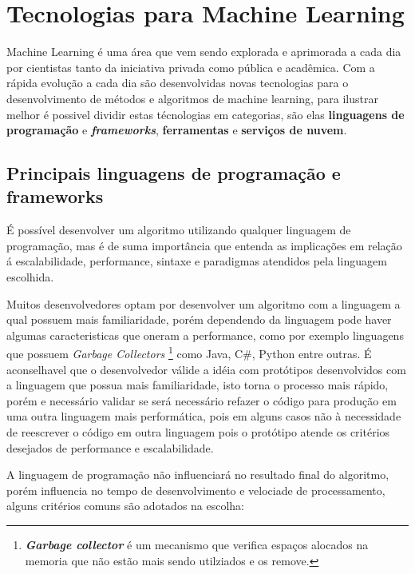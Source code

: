 \section{Tecnologias para Machine Learning}
\label{sec:tech-ml}

Machine Learning é uma área que vem sendo explorada e aprimorada a cada dia por cientistas tanto da iniciativa privada 
como pública e acadêmica. Com a rápida evolução a cada dia são desenvolvidas novas tecnologias para o desenvolvimento
de métodos e algoritmos de machine learning, para ilustrar melhor é possivel  dividir estas técnologias em categorias, são elas
\textbf{linguagens de programação} e \textbf{\textit{frameworks}}, \textbf{ferramentas} e \textbf{serviços de nuvem}. 

\subsection{Principais linguagens de programação e frameworks}
\label{subsec:ling-prog}

É possível desenvolver um algoritmo utilizando qualquer linguagem de programação, mas é de suma importância que entenda as implicações
em relação á escalabilidade, performance, sintaxe e paradigmas atendidos pela linguagem escolhida. 

Muitos desenvolvedores optam por desenvolver um algoritmo com a linguagem a qual possuem mais familiaridade, 
porém dependendo da linguagem pode haver algumas caracteristicas que  oneram a performance, como por exemplo linguagens que possuem 
\textit{Garbage Collectors} \footnote{\textbf{\textit{Garbage collector}} é um mecanismo que verifica espaços alocados na memoria que não estão mais sendo utilziados e os remove.} como Java, C\#, Python entre outras. É aconselhavel que o desenvolvedor válide a 
idéia com protótipos desenvolvidos com a linguagem que possua mais familiaridade, isto torna o processo mais rápido, porém e necessário
validar se será necessário refazer o código para produção em uma outra linguagem mais performática, pois em alguns casos não à necessidade
de reescrever o código em outra linguagem pois o protótipo atende os critérios desejados de performance e escalabilidade. 

A linguagem de programação não influenciará no resultado final do algoritmo, porém influencia no tempo de desenvolvimento e 
velociade de processamento, alguns critérios comuns são adotados na escolha:

